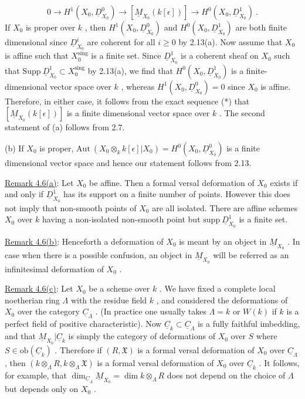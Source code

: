 \begin{equation}\tag{*}
0 \to H^{1}(X_{0}, \underline{D}^{0}_{X_{0}}) \to [\underline{M}_{X_{0}}(k[\epsilon])] \to H^{0}(X_{0}, \underline{D}^{1}_{X_{0}}) \ .
\end{equation}
If  $X_{0}$  is proper over  $k$  , then  $H^{1}(X_{0}, \underline{D}^{0}_{X_{0}})$  and  $H^{0}(X_{0}, \underline{D}^{1}_{X_{0}})$  are both finite dimensional since  $\underline{D}^{i}_{X_{0}}$  are coherent for all  $i \geq 0$  by 2.13(a). Now assume that $X_{0}$  is affine such that  $X_{0}^{\mathrm{sing}}$  is a finite set. Since  $\underline{D}^{1}_{X_{0}}$  is a coherent sheaf on  $X_{0}$  such that  $\mathrm{Supp}\ \underline{D}^{1}_{X_{0}} \subset X_{0}^{\mathrm{sing}}$  by 2.13(a), we find that  $H^{0}(X_{0}, \underline{D}^{1}_{X_{0}})$  is a finite-dimensional vector space over  $k$  , whereas  $H^{1}(X_{0}, \underline{D}^{0}_{X_{0}}) = 0$  since  $X_{0}$ is affine. Therefore, in either case, it follows from the exact sequence (*) that $[\underline{M}_{X_{0}}(k[\epsilon])]$  is a finite dimensional vector space over  $k$  . The second statement of (a) follows from 2.7.

          (b)  If  $X_{0}$  is proper,  $\mathrm{Aut}\ (X_{0} \otimes_{k} k[\epsilon]|X_{0}) = H^{0}(X_{0}, \underline{D}^{0}_{X_{0}})$  is a finite dimensional vector space and hence our statement follows from 2.13.

\underline{Remark 4.6(a)}:  Let  $X_{0}$  be affine. Then a formal versal deformation of  $X_{0}$ exists if and only if  $\underline{D}^{1}_{X_{0}}$  has its support on a finite number of points. However this does not imply that non-smooth points of  $X_{0}$  are all isolated. There are affine schemes  $X_{0}$  over $k$  having a non-isolated non-smooth point but  $\mathrm{supp}\ \underline{D}^{1}_{X_{0}}$ is a finite set.

\underline{Remark 4.6(b)}:  Henceforth a deformation of  $X_{0}$  is meant by an object in  $\underline{M}_{X_{0}}$  . In case when there is a possible confusion, an object in  $\underline{M}_{X_{0}}$  will be referred as an infinitesimal deformation of  $X_{0}$  .

\underline{Remark 4.6(c)}:  Let  $X_{0}$  be a scheme over  $k$  . We have fixed a complete local noetherian ring  $\Lambda$  with the residue field  $k$  , and considered the deformations
of  $X_{0}$  over the category  $\underline{C}_{\Lambda}$  . (In practice one usually takes  $\Lambda = k$  or  $W(k)$ if  $k$  is a perfect field of positive characteristic). Now  $\underline{C}_{k} \subset \underline{C}_{\Lambda}$  is a fully faithful imbedding, and that  $\underline{M}_{X_{0}}|\underline{C}_{k}$  is simply the category of deformations of $X_{0}$  over  $S$  where  $S \in \mathrm{ob}(\underline{C}_{k})$  . Therefore if  $(R, \mathfrak{X})$  is a formal versal deformation of  $X_{0}$  over  $\underline{C}_{\Lambda}$  , then  $(k \otimes_{\Lambda} R, k \otimes_{\Lambda} \mathfrak{X})$  is a formal versal deformation of $X_{0}$  over  $\underline{C}_{k}$  . It follows, for example, that  $\dim_{\underline{C}_{\Lambda}} \underline{M}_{X_{0}} = \dim k \otimes_{\Lambda} R$  does not depend on the choice of  $\Lambda$  but depends only on  $X_{0}$  .

